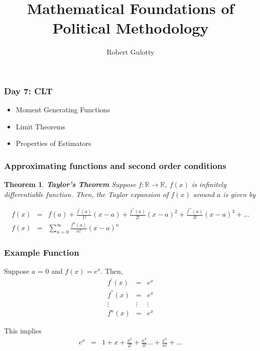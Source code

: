 \documentclass{beamer}
\title[PLSC 43401]{Mathematical Foundations of Political Methodology}
\author{Robert Gulotty}
\institute[Chicago]{University of Chicago}
\newtheorem{thm}{Theorem}
\numberwithin{equation}{section}
\begin{document}
\begin{frame}
\maketitle
\end{frame}


\begin{frame}
\frametitle{Day 7: CLT}
\begin{itemize}
\item Moment Generating Functions
\item Limit Theorems
\item Properties of Estimators
\end{itemize}
\end{frame}





\begin{frame}
\frametitle{Approximating functions and second order conditions}


\begin{thm}
\textbf{Taylor's Theorem}
Suppose $f:\mathbb{R} \rightarrow \mathbb{R}$, $f(x)$ is infinitely differentiable function.  Then, the Taylor expansion of $f(x)$ around \alert{$a$} is given by 

\begin{eqnarray}
f(x) & = & f(a) + \frac{f^{'}(a)}{1!} (x- a) + \frac{f^{''}(a)}{2!} (x - a)^2 + \frac{f^{'''}(a)}{3!}(x- a)^3 + \hdots \nonumber \\
f(x) & = & \sum_{n=0}^{\infty } \frac{f^{n} (a) }{n!} (x - a)^n \nonumber
\end{eqnarray}

\end{thm}




\end{frame}


\begin{frame}
\frametitle{Example Function}

Suppose $a$ = 0 and $f(x) = e^{x}$.  Then, 
\begin{eqnarray}
f^{'}(x) & = & e^{x} \nonumber \\
f^{''}(x) & = & e^{x} \nonumber \\
\vdots  & \vdots & \vdots \nonumber \\
f^{n} (x) & = & e^{x} \nonumber 
\end{eqnarray}

This implies
\begin{eqnarray}
e^{x} & = & 1 + x + \frac{x^{2}}{2!} + \frac{x^3}{3!} \hdots + \frac{x^{n}}{n!} + \hdots \nonumber \end{eqnarray}

\end{frame}
\end{document}
